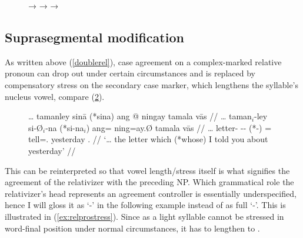 \begin{figure}[h]
\pex\label{ex:adjredup}
	\a {}
		→ 
	\a {}
		→ 
	\a {}
		→ 
\xe
\end{figure}


\subsection{Suprasegmental modification}

As written above (\autoref{doublerel}), case agreement on a complex-marked
relative pronoun can drop out under certain
circumstances and is replaced by compensatory stress on the secondary case
marker, which lengthens the syllable's nucleus vowel, compare
(\ref{ex:relpromorphphon}).

\begin{figure}[h]
\ex\label{ex:relpromorphphon}
\begingl
	\gla … tamanley sinā \textup{(}*sina\textup{)} ang @ ningay tamala
		vās //
	\glb … taman$_i$-ley si-Ø$_i$-na (*si-na$_i$) ang= ning=ay.Ø tamala vās //
	\glc … letter-\PargI{} \Rel{}-\PatTI{}-\Gen{} (*\Rel{}-\Gen{}) \AgtT{}= 
		tell=\Fsg{}.\Top{} yesterday \Ssg{}.\Parg{} //
	\glft `… the letter which (*whose) I told you about yesterday' //
\endgl\xe
\end{figure}

This can be reinterpreted so that vowel length/stress itself is what signifies
the agreement of the relativizer with the preceding NP. Which grammatical role
the relativizer's head represents an agreement controller is essentially
underspecified, hence I will gloss it as `-\Agr{}' in the following example
instead of as full `-\PargI{}'. This is illustrated in (\ref{ex:relprostress}).
Since  as a light syllable cannot be stressed in word-final
position under normal circumstances, it has to lengthen to .


